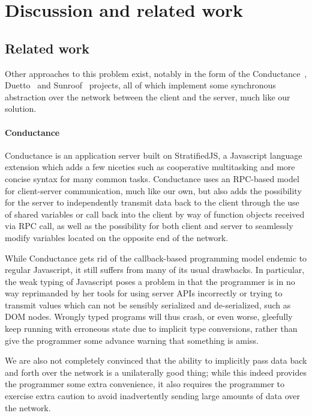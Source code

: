 \documentclass[preprint]{sigplanconf}
\begin{document}
\section{Discussion and related work}

\subsection{Related work}

Other approaches to this problem exist, notably in the form of the
Conductance\ \cite{conductance}, Duetto\ \cite{duetto} and
Sunroof\ \cite{sunroof} projects, all of which implement some synchronous
abstraction over the network between the client and the server, much like our
solution.

\paragraph{Conductance} Conductance is an application server built on
StratifiedJS, a Javascript language extension which adds a few niceties such as
cooperative multitasking and more concise syntax for many common tasks.
Conductance uses an RPC-based model for client-server communication, much like
our own, but also adds the possibility for the server to independently transmit
data back to the client through the use of shared variables or call back into
the client by way of function objects received via RPC call, as well as the
possibility for both client and server to seamlessly modify variables located
on the opposite end of the network.

While Conductance gets rid of the callback-based programming model endemic to
regular Javascript, it still suffers from many of its usual drawbacks. In
particular, the weak typing of Javascript poses a problem in that the
programmer is in no way reprimanded by her tools for using server APIs
incorrectly or trying to transmit values which can not be sensibly serialized
and de-serialized, such as DOM nodes. Wrongly typed programs will thus crash, or
even worse, gleefully keep running with erroneous state due to implicit type
conversions, rather than give the programmer some advance warning that something
is amiss.

We are also not completely convinced that the ability to implicitly pass data
back and forth over the network is a unilaterally good thing; while this indeed
provides the programmer some extra convenience, it also requires the programmer
to exercise extra caution to avoid inadvertently sending large amounts of data
over the network.
\end{document}
